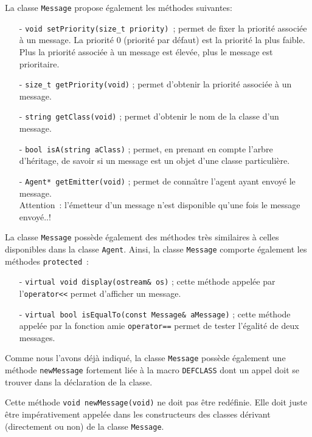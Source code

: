 \documentclass[12pt]{article}
\begin{document}
\newpage

La classe {\tt Message} propose \'egalement les m\'ethodes suivantes:

\begin{itemize}
\vspace{-0.2cm}
\item[-] {\tt void   setPriority(size\_t priority) }; permet de fixer
la priorit\'e associ\'ee \`a un message. 
La priorit\'e 0 (priorit\'e par d\'efaut) est la priorit\'e la plus faible.
Plus la priorit\'e associ\'ee \`a un message est \'elev\'ee, plus
le message est prioritaire.
\item[-] {\tt size\_t getPriority(void)} ; permet d'obtenir la priorit\'e
associ\'ee \`a un message.
\item[-] {\tt string getClass(void)} ; permet d'obtenir le nom de la
classe d'un message.
\item[-] {\tt bool isA(string aClass)} ; permet, en prenant en compte
l'arbre d'h\'eritage, de savoir si un message est un objet d'une classe
particuli\`ere.
\item[-] {\tt Agent* getEmitter(void)} ; permet de conna\^ \i tre
l'agent ayant envoy\'e le message.\\
Attention~: l'\'emetteur d'un message n'est disponible qu'une fois
le message envoy\'e..!
\end{itemize}

La classe {\tt Message} poss\`ede \'egalement des m\'ethodes
tr\`es similaires \`a celles disponibles dans la classe {\tt Agent}. 
Ainsi, la classe {\tt Message} comporte \'egalement les m\'ethodes
{\tt protected}~:
\begin{itemize}
\item[-] {\tt virtual void display(ostream\& os)} ; cette m\'ethode
appel\'ee par l'{\tt operator<<} permet d'afficher un message.
\vspace{-0.2cm}
\item[-] {\tt virtual bool isEqualTo(const Message\& aMessage)} ; cette
m\'ethode appel\'ee par la fonction amie {\tt operator==} permet
de tester l'\'egalit\'e de deux messages.
\end{itemize}

Comme nous l'avons d\'ej\`a indiqu\'e, la classe {\tt Message} poss\`ede
\'egalement une m\'ethode {\tt newMessage} fortement li\'ee
\`a la macro {\tt DEFCLASS} dont un appel doit se trouver dans la
d\'eclaration de la classe.

Cette m\'ethode {\tt void newMessage(void)} ne doit pas \^etre red\'efinie.
Elle doit juste \^etre imp\'erativement appel\'ee dans les constructeurs
des classes d\'erivant (directement ou non) de la classe {\tt Message}.
\end{document}
